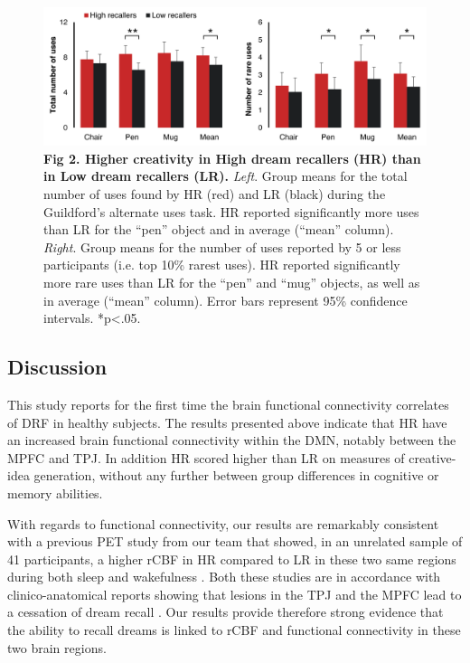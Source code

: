 \begin{figure}[!htbp]
	\includegraphics[width=\textwidth]{Fig/Results/Inertia/Creativity/Fig2.png}
	\caption*{\textbf{Fig 2. Higher creativity in High dream recallers (HR) than in Low dream recallers (LR).} \emph{Left}. Group means for the total number of uses found by HR (red) and LR (black) during the Guildford’s alternate uses task. HR reported significantly more uses than LR for the “pen” object and in average (“mean” column). \emph{Right}. Group means for the number of uses reported by 5 or less participants (i.e. top 10\% rarest uses). HR reported significantly more rare uses than LR for the “pen” and “mug” objects, as well as in average (“mean” column). Error bars represent 95\% confidence intervals. *p<.05.}
\end{figure}


\subsection*{Discussion}
\label{res:dmn-crea:discussion}

This study reports for the first time the brain functional connectivity correlates of DRF in healthy subjects. The results presented above indicate that HR have an increased brain functional connectivity within the DMN, notably between the MPFC and TPJ. In addition HR scored higher than LR on measures of creative-idea generation, without any further between group differences in cognitive or memory abilities.

With regards to functional connectivity, our results are remarkably consistent with a previous PET study from our team that showed, in an unrelated sample of 41 participants, a higher rCBF in HR compared to LR in these two same regions during both sleep and wakefulness \citep{eichenlaub_resting_2014}. Both these studies are in accordance with clinico-anatomical reports showing that lesions in the TPJ and the MPFC lead to a cessation of dream recall \citep{solms_neuropsychology_1997}. Our results provide therefore strong evidence that the ability to recall dreams is linked to rCBF and functional connectivity in these two brain regions. 

